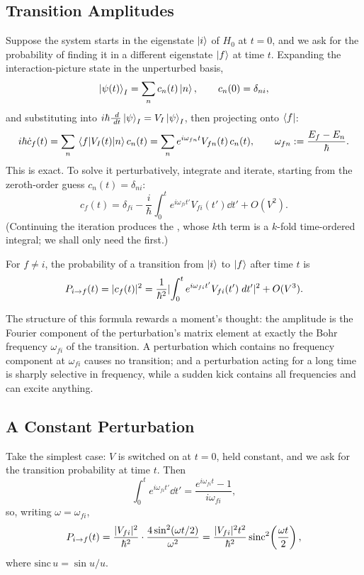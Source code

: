 \documentclass[a4paper]{scrartcl}
\begin{document}
\subsection{Transition Amplitudes}

Suppose the system starts in the eigenstate $\ket{i}$ of $H_0$ at $t=0$, and we ask for the probability of finding it in a different eigenstate $\ket f$ at time $t$. Expanding the interaction-picture state in the unperturbed basis,
$$
\ket{\psi(t)}_I = \sum_n c_n(t)\ket n, \qquad c_n(0) = \delta_{ni},
$$
and substituting into $i\hbar\frac{\; d}{\; d t}\ket\psi_I = V_I\ket\psi_I$, then projecting onto $\bra f$:
$$
i\hbar \dot c_f(t) = \sum_n \mel{f}{V_I(t)}{n}c_n(t) = \sum_n e^{i\omega_{fn}t}V_{fn}(t)\,c_n(t), \qquad \omega_{fn} := \frac{E_f - E_n}{\hbar}.
$$
This is exact. To solve it perturbatively, integrate and iterate, starting from the zeroth-order guess $c_n(t) = \delta_{ni}$:
$$
c_f(t) = \delta_{fi} - \frac{i}{\hbar}\int_0^t e^{i\omega_{fi}t'}V_{fi}(t')\dd t' + O(V^2).
$$
(Continuing the iteration produces the , whose $k$th term is a $k$-fold time-ordered integral; we shall only need the first.)

\begin{theorem}
    For $f \neq i$, the probability of a transition from $\ket i$ to $\ket f$ after time $t$ is
    $$
    P_{i\to f}(t) = \lvert c_f(t)\rvert^2 = \frac{1}{\hbar^2}\lvert\int_0^t e^{i\omega_{fi}t'}V_{fi}(t')\; d t'\rvert^2 + O(V^3).
    $$
\end{theorem}

The structure of this formula rewards a moment's thought: the amplitude is the Fourier component of the perturbation's matrix element at exactly the Bohr frequency $\omega_{fi}$ of the transition. A perturbation which contains no frequency component at $\omega_{fi}$ causes no transition; and a perturbation acting for a long time is sharply selective in frequency, while a sudden kick contains all frequencies and can excite anything.

\subsection{A Constant Perturbation}

Take the simplest case: $V$ is switched on at $t=0$, held constant, and we ask for the transition probability at time $t$. Then
$$
\int_0^t e^{i\omega_{fi}t'}\dd t' = \frac{e^{i\omega_{fi}t}-1}{i\omega_{fi}},
$$
so, writing $\omega = \omega_{fi}$,
$$
P_{i\to f}(t) = \frac{\lvert V_{fi}\rvert^2}{\hbar^2}\cdot\frac{4\sin^2(\omega t/2)}{\omega^2}
= \frac{\lvert V_{fi}\rvert^2 t^2}{\hbar^2}\,\mathrm{sinc}^2\!\left( \frac{\omega t}{2} \right),
$$
where $\mathrm{sinc}\,u = \sin u / u$.
\end{document}
